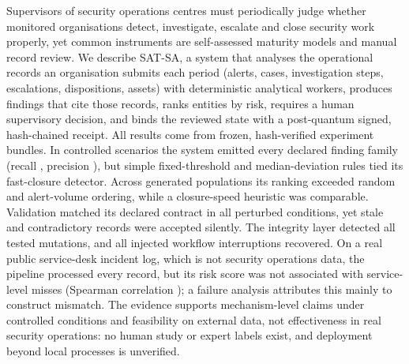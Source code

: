 Supervisors of security operations centres must periodically judge whether monitored
organisations detect, investigate, escalate and close security work properly, yet
common instruments are self-assessed maturity models and manual record review. We
describe SAT-SA, a system that analyses the operational records an organisation
submits each period (alerts, cases, investigation steps, escalations, dispositions,
assets) with  deterministic analytical workers, produces findings that
cite those records, ranks entities by risk, requires a human supervisory decision,
and binds the reviewed state with a post-quantum signed, hash-chained receipt. All
results come from frozen, hash-verified experiment bundles. In 
controlled scenarios the system emitted every declared finding family (recall
, precision ), but simple fixed-threshold and
median-deviation rules tied its fast-closure detector. Across 
generated populations its ranking exceeded random and alert-volume ordering, while a
closure-speed heuristic was comparable. Validation matched its declared contract in
all  perturbed conditions, yet stale and contradictory records were
accepted silently. The integrity layer detected all  tested
mutations, and all  injected workflow interruptions recovered. On a real
public service-desk incident log, which is not security operations data, the
pipeline processed every record, but its risk score was not associated with
service-level misses (Spearman correlation ); a failure analysis
attributes this mainly to construct mismatch. The evidence supports mechanism-level
claims under controlled conditions and feasibility on external data, not
effectiveness in real security operations: no human study or expert labels exist, and
deployment beyond local processes is unverified.
